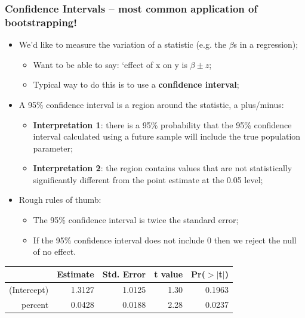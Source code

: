 \documentclass[aspectratio=169]{beamer}
\theoremstyle{principle}
\begin{document}
\begin{frame}
\frametitle{Confidence Intervals -- most common application of bootstrapping!}

\begin{itemize}
\item We'd like to measure the variation of a statistic (e.g. the $\beta$s in a regression);
\begin{itemize}
\item Want to be able to say: `effect of x on y is $\beta \pm z$;
\item Typical way to do this is to use a \textbf{confidence interval};
\end{itemize}
\bigskip

\item A 95\% confidence interval is a region around the statistic, a plus/minus:
\begin{itemize}
\item \textbf{Interpretation 1}: there is a 95\% probability that the 95\% confidence interval calculated using a future sample will include the true population parameter;
\item \textbf{Interpretation 2}: the region contains values that are not statistically significantly different from the point estimate at the 0.05 level;
\end{itemize}
\bigskip

\item Rough rules of thumb:
\begin{itemize}
\item The 95\% confidence interval is twice the standard error;
\item If the 95\% confidence interval does not include 0 then we reject the null of no effect.
\end{itemize}

\end{itemize}

\begin{table}[ht]
\centering
\begin{tabular}{rrrrr}
  \hline
 & Estimate & Std. Error & t value & Pr($>$$|$t$|$) \\ 
  \hline
(Intercept) & 1.3127 & 1.0125 & 1.30 & 0.1963 \\ 
  percent & 0.0428 & 0.0188 & 2.28 & 0.0237 \\ 
   \hline
\end{tabular}
\end{table}

\end{frame}
\end{document}
